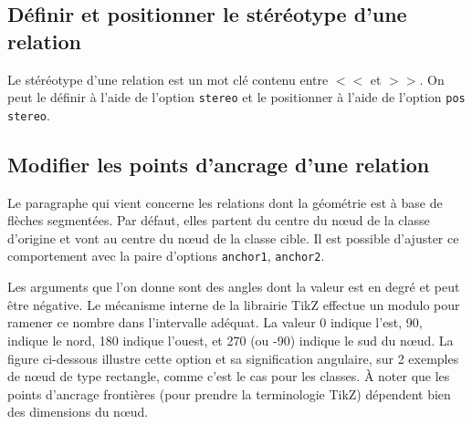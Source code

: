 \documentclass[a4paper,11pt]{report}
\newcommand{\inputTikZ}[1]{%
  }%
\newcommand{\inputTikZ}[1]{%
    \texttt{[image: fig/\#1.pdf]}%
  }%
\begin{document}
\subsection{Définir et positionner le stéréotype d'une relation}\label{ss.relstereo}

Le stéréotype d'une relation est un mot clé contenu entre $<<$ et $>>$. On peut le définir à l'aide de l'option {\tt stereo} et le positionner à l'aide de l'option \hypertarget{posstereo}{{\tt pos stereo}}.

\medskip

\begin{minipage}{0.5\textwidth}

\end{minipage}
\begin{minipage}{0.4\textwidth}
\begin{center}
\inputTikZ{figure19}
\end{center}
\end{minipage}

\subsection{Modifier les points d'ancrage d'une relation}\label{ss.relanchor}

Le paragraphe qui vient concerne les relations dont la géométrie est à base de flèches segmentées. Par défaut, elles partent du centre du n\oe{}ud de la classe d'origine et vont au centre du n\oe{}ud de la classe cible. Il est possible d'ajuster ce comportement avec la paire d'options \hypertarget{anchor1}{{\tt anchor1}}, \hypertarget{anchor2}{{\tt anchor2}}.

\medskip

\begin{minipage}{0.6\textwidth}

\end{minipage}
\begin{minipage}{0.4\textwidth}
\begin{center}
\inputTikZ{figure20}
\end{center}
\end{minipage}

\medskip

Les arguments que l'on donne sont des angles dont la valeur est en degré et peut être négative. Le mécanisme interne de la librairie {\sc TikZ} effectue un modulo pour ramener ce nombre dans l'intervalle adéquat. La valeur 0 indique l'est, 90, indique le nord, 180 indique l'ouest, et 270 (ou -90) indique le sud du n\oe{}ud. La figure ci-dessous illustre cette option et sa signification angulaire, sur 2 exemples de n\oe{}ud de type rectangle, comme c'est le cas pour les classes. \`{A} noter que les points d'ancrage frontières (pour prendre la terminologie TikZ) dépendent bien des dimensions du n\oe{}ud.
\end{document}
